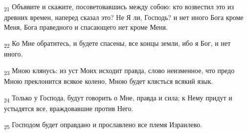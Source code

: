 \begin{tcolorbox}
\textsubscript{21} Объявите и скажите, посоветовавшись между собою: кто возвестил это из древних времен, наперед сказал это? Не Я ли, Господь? и нет иного Бога кроме Меня, Бога праведного и спасающего нет кроме Меня.
\end{tcolorbox}
\begin{tcolorbox}
\textsubscript{22} Ко Мне обратитесь, и будете спасены, все концы земли, ибо я Бог, и нет иного.
\end{tcolorbox}
\begin{tcolorbox}
\textsubscript{23} Мною клянусь: из уст Моих исходит правда, слово неизменное, что предо Мною преклонится всякое колено, Мною будет клясться всякий язык.
\end{tcolorbox}
\begin{tcolorbox}
\textsubscript{24} Только у Господа, будут говорить о Мне, правда и сила; к Нему придут и устыдятся все, враждовавшие против Него.
\end{tcolorbox}
\begin{tcolorbox}
\textsubscript{25} Господом будет оправдано и прославлено все племя Израилево.
\end{tcolorbox}

